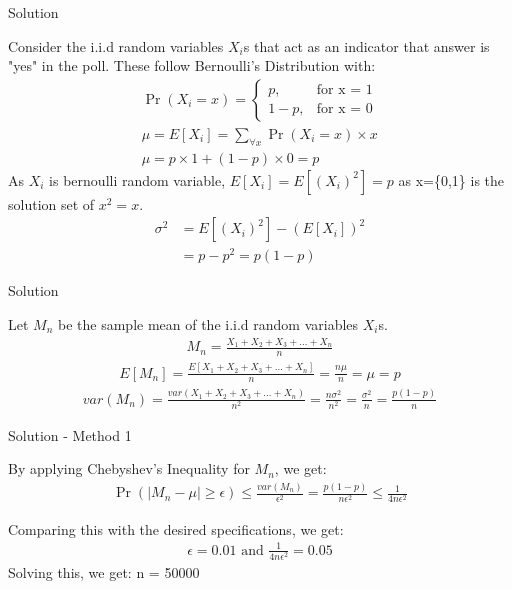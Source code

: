 \documentclass{beamer}
\providecommand{\abs}[1]{\vert#1\vert}
\providecommand{\pr}[1]{\ensuremath{\Pr\left(#1\right)}}
\begin{document}
\begin{frame}{Solution}
\begin{block}{}
Consider the i.i.d random variables $X_i$s that act as an indicator that answer is "yes" in the poll. These follow Bernoulli's Distribution with:
    \begin{align}
    \pr{X_i = x} =\begin{cases}
     p, &\text{for x = 1}  \\
     1-p, &\text{for x = 0} 
                \end{cases}\\
    \mu = E[X_i] = \sum_{\forall x}^{} \pr{X_i=x} \times x\\
    \mu = p\times1 + (1-p)\times0 = p
    \end{align}
As $X_i$ is bernoulli random variable, $E[X_i] = E[(X_i)^2] = p$ as x=\{0,1\} is the solution set of $x^2 = x$.
\begin{align}
    \sigma^2 &= E[(X_i)^2] - (E[X_i])^2\\
    &= p - p^2 = p(1-p)
\end{align}
\end{block}
\end{frame}

\begin{frame}{Solution}
\begin{block}{}
Let $M_n$ be the sample mean of the i.i.d random variables $X_i$s. 
    \begin{align}
    M_n = \frac{X_1 + X_2 + X_3 + \dots + X_n}{n}
    \end{align}
    \begin{align}
    E[M_n] = \frac{E[X_1 + X_2 + X_3 + \dots + X_n]}{n} = \frac{n\mu}{n} = \mu = p
    \end{align}
    \begin{align}
        var(M_n) = \frac{var(X_1 + X_2 + X_3 + \dots + X_n)}{n^2} = \frac{n\sigma^2}{n^2} = \frac{\sigma^2}{n} = \frac{p(1-p)}{n}
    \end{align}
\end{block}

\end{frame}

\begin{frame}{Solution - Method 1}
\begin{block}{}
    By applying Chebyshev's Inequality for $M_n$, we get:
    \begin{align}
        \pr{\abs{M_n - \mu} \geq \epsilon} \leq \frac{var(M_n)}{\epsilon^2} = \frac{p(1-p)}{n\epsilon^2} \leq \frac{1}{4n\epsilon^2}
    \end{align}
\end{block}

\begin{block}{}
Comparing this with the desired specifications, we get:
\begin{align}
  \epsilon = 0.01 \text{ and } \frac{1}{4n\epsilon^2} = 0.05   
\end{align}
Solving this, we get: 
n = 50000
\end{block}
\end{frame}
\end{document}
